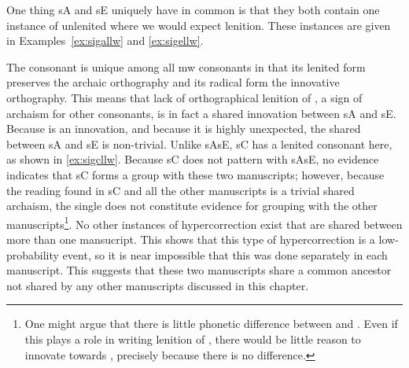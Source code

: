 One thing \gls{sA} and \gls{sE} uniquely have in common is that they both contain one instance of unlenited  where we would expect lenition. These instances are given in Examples~\ref{ex:sigallw} and \ref{ex:sigellw}.
\begin{mwl}
\end{mwl}
The consonant  is unique among all \gls{mw} consonants in that its lenited form preserves the archaic orthography and its radical form the innovative orthography. This means that lack of orthographical lenition of , a sign of archaism for other consonants, is in fact a shared innovation between \gls{sA} and \gls{sE}. Because  is an innovation, and because it is highly unexpected, the shared  between \gls{sA} and \gls{sE} is non-trivial. Unlike \gls{sA}\gls{sE}, \gls{sC} has a lenited consonant here, as shown in \ref{ex:sigcllw}.
Because \gls{sC} does not pattern with \gls{sA}\gls{sE}, no evidence indicates that \gls{sC} forms a group with these two manuscripts; however, because the reading   found in \gls{sC} and all the other manuscripts is a trivial shared archaism, the single  does not constitute  evidence for grouping with the other manuscripts\footnote{One might argue that there is little phonetic difference between  and . Even if this plays a role in writing lenition of , there would be little reason to innovate towards , precisely because there is no difference.}. No other instances of hypercorrection exist that are shared between more than one mansucript.  This shows that this type of hypercorrection is a low-probability event, so it is  near impossible that this was done separately in each manuscript.  This suggests that these two manuscripts share a common ancestor not shared by any other manuscripts discussed in this chapter.


